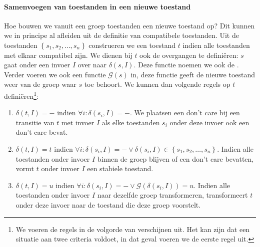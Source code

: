 \paragraph{Samenvoegen van toestanden in een nieuwe toestand}
Hoe bouwen we vanuit een groep toestanden een nieuwe toestand op? Dit kunnen we in principe al afleiden uit de definitie van compatibele toestanden. Uit de toestanden $\left\{s_1,s_2,\ldots,s_n\right\}$ construeren we een toestand $t$ indien alle toestanden met elkaar compatibel zijn. We dienen bij $t$ ook de overgangen te defini\"eren: $s$ gaat onder een invoer $I$ over naar $\delta\left(s,I\right)$. Deze functie noemen we ook de . Verder voeren we ook een functie $\mathcal{G}\left(s\right)$ in, deze functie geeft de nieuwe toestand weer van de groep waar $s$ toe behoort. We kunnen dan volgende regels op $t$ defini\"eren\footnote{We voeren de regels in de volgorde van verschijnen uit. Het kan zijn dat een situatie aan twee criteria voldoet, in dat geval voeren we de eerste regel uit.}:
\begin{enumerate}
 \item $\delta\left(t,I\right)=-$ indien $\forall i:\delta\left(s_i,I\right)=-$. We plaatsen een don't care bij een transitie van $t$ met invoer $I$ als elke toestanden $s_i$ onder deze invoer ook een don't care bevat.
 \item $\delta\left(t,I\right)=t$ indien $\forall i:\delta\left(s_i,I\right)=-\vee\delta\left(s_i,I\right)\in\left\{s_1,s_2,\ldots,s_n\right\}$. Indien alle toestanden onder invoer $I$ binnen de groep blijven of een don't care bevatten, vormt $t$ onder invoer $I$ een stabiele toestand.
 \item $\delta\left(t,I\right)=u$ indien $\forall i:\delta\left(s_i,I\right)=-\vee\mathcal{G}\left(\delta\left(s_i,I\right)\right)=u$. Indien alle toestanden onder invoer $I$ naar dezelfde groep transformeren, transformeert $t$ onder deze invoer naar de toestand die deze groep voorstelt.
\end{enumerate}

